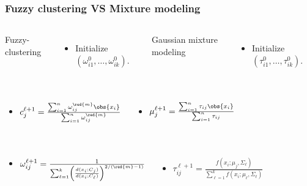 \begin{frame}[t]
\frametitle{Fuzzy clustering VS Mixture modeling}


\begin{columns}
Fuzzy-clustering\medskip
\begin{itemize}
\item Initialize $(\omega_{i1}^0, \dots, \omega_{ik}^0)$.
\end{itemize}

Gaussian mixture modeling\medskip
\begin{itemize}
\item Initialize $(\tau_{i1}^0, \dots, \tau_{ik}^0)$.
\end{itemize}
\end{columns}

\begin{columns}
\begin{itemize}
\item $c^{\ell+1}_j = \frac{\sum_{i=1}^n \omega_{i j}^{\red{m}} \obs{x_i}}{\sum_{i=1}^n \omega_{i j}^{\red{m}}}$
\end{itemize}
\begin{itemize}
\item $\mu^{\ell+1}_j = \frac{\sum_{i=1}^n \tau_{i j} \obs{x_i}}{\sum_{i=1}^n \tau_{i j}}$
\end{itemize}
\end{columns}

\begin{columns}
\begin{itemize}
\item $\omega^{\ell+1}_{ij} = \frac{1}{\sum_{\ell = 1}^k \left( \frac{d(x_i; C_j)}{d(x_i; C_\ell) } \right)^{2/({\red{m}}-1)}}$
\end{itemize}
\begin{itemize}
\item $\tau^{\ell+1}_{ij} = \frac{f(x_i; \mu_j, \Sigma_\ell)}{\sum_{\ell = 1}^k f(x_i; \mu_\ell, \Sigma_\ell) }$
\end{itemize}
\end{columns}


\end{frame}